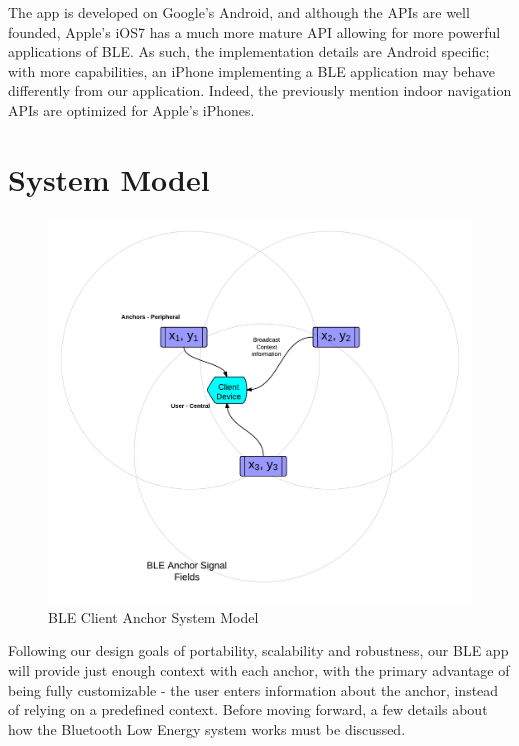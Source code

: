 \documentclass{sig-alternate}
\begin{document}
The app is developed on Google's Android, and although
the APIs are well founded, Apple's iOS7 has a much more
mature API allowing for more powerful applications of BLE.
As such, the implementation details are Android specific; 
with more capabilities, an iPhone implementing a BLE 
application may behave differently from our application.
Indeed, the previously mention indoor navigation APIs are
optimized for Apple's iPhones.


\section{System Model}
\label{sec:sys_model}

\begin{figure}[h!]
	\begin{center}
		\includegraphics[width=1.00\linewidth]{system_model}
	\end{center}
	\vspace{-12pt}
	\caption{BLE Client Anchor System Model}
	\label{fig:System Model}
\end{figure}

Following our design goals of portability, scalability and 
robustness, our BLE app will provide just enough context
with each anchor, with the primary advantage of being
fully customizable - the user enters information about
the anchor, instead of relying on a predefined context.
Before moving forward, a few details about how the Bluetooth
Low Energy system works must be discussed.
\end{document}
